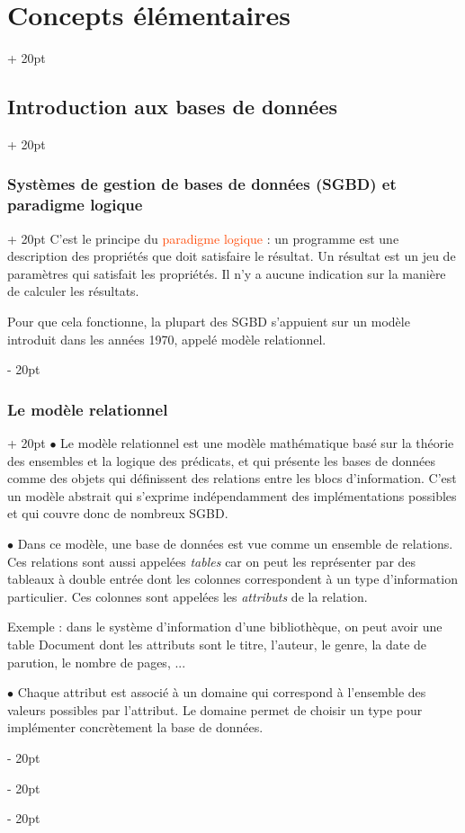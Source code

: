 \documentclass[a4paper, 12pt, twoside]{article}
\renewcommand{\emph}{\textcolor{ff4500}}
\newcommand{\ind}[1][20pt]{\advance\leftskip + #1}
\newcommand{\deind}[1][20pt]{\advance\leftskip - #1}
\newenvironment{indt}[2][20pt]{#2 \par \ind[#1]}{\par \deind} %
\begin{document}
\begin{indt}{\section{Concepts élémentaires}}
\begin{indt}{\subsection{Introduction aux bases de données}}
\begin{indt}{\subsubsection{Systèmes de gestion de bases de données (SGBD) et paradigme logique}}
                C'est le principe du \emph{paradigme logique} : un programme est une description des propriétés que doit satisfaire le résultat. Un résultat est un jeu de paramètres qui satisfait les propriétés. Il n'y a aucune indication sur la manière de calculer les résultats.
                
                Pour que cela fonctionne, la plupart des SGBD s'appuient sur un modèle introduit dans les années 1970, appelé modèle relationnel.
            \end{indt}
            
            \vspace{12pt}
            
            \begin{indt}{\subsubsection{Le modèle relationnel}}
                $\bullet$ Le modèle relationnel est une modèle mathématique basé sur la théorie des ensembles et la logique des prédicats, et qui présente les bases de données comme des objets qui définissent des relations entre les blocs d'information. C'est un modèle abstrait qui s'exprime indépendamment des implémentations possibles et qui couvre donc de nombreux SGBD.
                
                \vspace{12pt}
                
                $\bullet$ Dans ce modèle, une base de données est vue comme un ensemble de relations. Ces relations sont aussi appelées \textit{tables} car on peut les représenter par des tableaux à double entrée dont les colonnes correspondent à un type d'information particulier. Ces colonnes sont appelées les \textit{attributs} de la relation.
                
                \vspace{6pt}
                
                Exemple : dans le système d'information d'une bibliothèque, on peut avoir une table Document dont les attributs sont le titre, l'auteur, le genre, la date de parution, le nombre de pages, ...
                
                \vspace{12pt}
                
                $\bullet$ Chaque attribut est associé à un domaine qui correspond à l'ensemble des valeurs possibles par l'attribut. Le domaine permet de choisir un type pour implémenter concrètement la base de données.
                

\end{indt}
\end{indt}
\end{indt}
\end{document}
